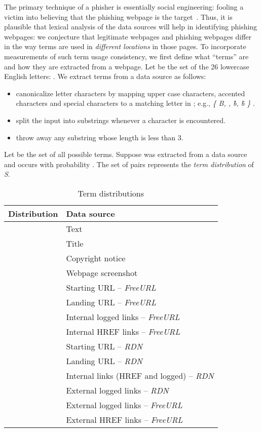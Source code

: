 \documentclass[10pt,conference,compsocconf,letterpaper]{IEEEtran}
\begin{document}
The primary technique of a phisher is essentially social engineering: fooling a victim into believing that the phishing webpage is the target~\cite{hardy:2014:targeted}. Thus, it is plausible that lexical analysis of the data sources will help in identifying phishing webpages: we conjecture that legitimate webpages and phishing webpages differ in the way terms are used in \textit{different locations} in those pages.
To incorporate measurements of such term usage consistency, we first define what ``terms'' are and how they are extracted from a webpage.
Let  be the set of the 26 lowercase English letters:
. We extract terms from a data source as follows:
\begin{itemize}
 \item canonicalize letter characters by mapping upper case characters, accented characters and special characters to a matching letter in ; e.g., \textit{ \{ B, , \`b, \^b \} }.
 \item split the input into substrings whenever a character   is encountered.
 \item throw away any substring whose length is less than 3.
\end{itemize}
Let   be the set of all possible terms. Suppose  was extracted from a data source  and  occurs with probability .
The set of  pairs  represents the \emph{term distribution}  of \emph{S}.


\begin{table}[tbh]
\caption{Term distributions} 
\centering
\begin{tabular}{l l}

\textbf{Distribution} & \textbf{Data source} \\ \hline
 & Text \\
 & Title \\
 & Copyright notice  \\
 & Webpage screenshot \\
 & Starting URL  -- \textit{FreeURL} \\
 & Landing URL -- \textit{FreeURL} \\
 & Internal logged links -- \textit{FreeURL} \\
 & Internal HREF links -- \textit{FreeURL} \\
 & Starting URL -- \textit{RDN} \\
 & Landing URL -- \textit{RDN} \\
 & Internal links (HREF and logged) -- \textit{RDN} \\
 & External logged links -- \textit{RDN} \\
 & External logged links -- \textit{FreeURL} \\
 & External HREF links -- \textit{FreeURL} \\


\end{tabular}
\label{tab:label_sets}
\end{table}
\end{document}

